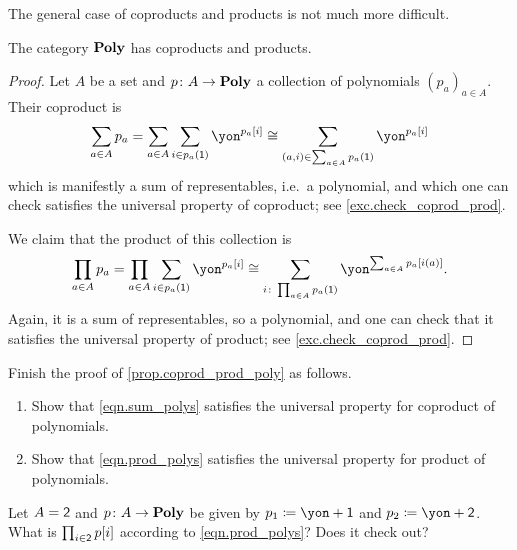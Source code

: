 \documentclass[Book-Poly]{subfiles}
\begin{document}
The general case of coproducts and products is not much more difficult.

\begin{proposition}\label{prop.coprod_prod_poly}
The category $\textbf{Poly}$ has coproducts and products.
\end{proposition}
\begin{proof}
Let $A$ be a set and $p\colon A\to\textbf{Poly}$ a collection of polynomials $(p_a)_{a\in A}$.%
Their coproduct is
\begin{equation}\label{eqn.sum_polys}
\sum_{a\in A}p_a=\sum_{a\in A}\sum_{i\in p_a(\1)}\yon^{p_a[i]}\cong\sum_{(a,i)\in\sum_{a\in A}p_a(\1)}\yon^{p_a[i]}
\end{equation}
which is manifestly a sum of representables, i.e.\ a polynomial, and which one can check satisfies the universal property of coproduct; see \cref{exc.check_coprod_prod}.

We claim that the product of this collection is
\begin{equation}\label{eqn.prod_polys}
\prod_{a\in A}p_a=
\prod_{a\in A}\sum_{i\in p_a(\1)}\yon^{p_a[i]}\cong
\sum_{i\colon \prod_{a\in A}p_a(\1)}\yon^{\sum_{a\in A}p_a[i(a)]}.
\end{equation}
Again, it is a sum of representables, so a polynomial, and one can check that it satisfies the universal property of product; see \cref{exc.check_coprod_prod}.
\end{proof}

\begin{exercise}\label{exc.check_coprod_prod}
Finish the proof of \cref{prop.coprod_prod_poly} as follows.
\begin{enumerate}
	\item Show that \eqref{eqn.sum_polys} satisfies the universal property for coproduct of polynomials.
	\item Show that \eqref{eqn.prod_polys} satisfies the universal property for product of polynomials.
\qedhere
\end{enumerate}
\end{exercise}

\begin{exercise}
Let $A=\textsf{2}$ and $p\colon A\to\textbf{Poly}$ be given by $p_1\coloneqq\yon+\1$ and $p_2\coloneqq\yon+\2$. What is $\prod_{i\in\textsf{2}}p[i]$ according to \cref{eqn.prod_polys}? Does it check out?
\end{exercise}
\end{document}
